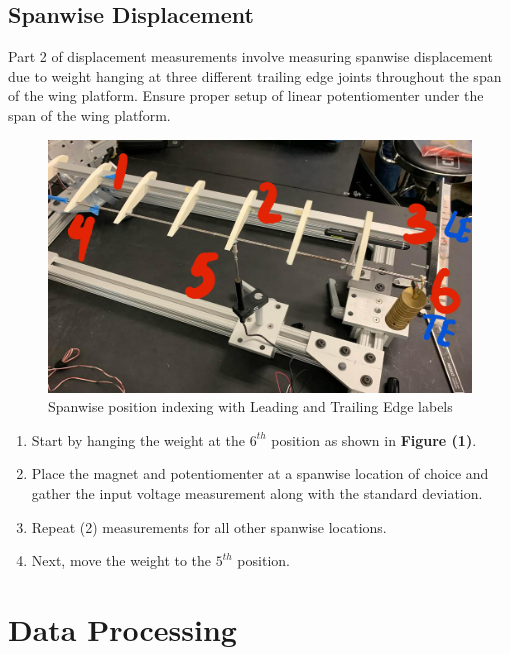 \documentclass{article}
\begin{document}
  \subsection{Spanwise Displacement}
  Part 2 of displacement measurements involve measuring spanwise displacement due to weight hanging at three different trailing edge joints throughout the span of the wing platform. Ensure proper setup of linear potentiomenter under the span of the wing platform. 
  \begin{figure}
    \centering
    \includegraphics[width = \textwidth]{lab3images/SpanwiseLocations.jpg}
    \caption{Spanwise position indexing with Leading and Trailing Edge labels}
  \end{figure}
  
  \begin{enumerate}
    \item Start by hanging the weight at the $6^{th}$ position as shown in \textbf{Figure (1)}. 
    \vspace{2.5mm}

    \item Place the magnet and potentiomenter at a spanwise location of choice and gather the input voltage measurement along with the standard deviation.
    \vspace{2.5mm}

    \item Repeat (2) measurements for all other spanwise locations.
    \vspace{2.5mm}

    \item Next, move the weight to the $5^{th}$ position.
    \vspace{2.5mm}
  \end{enumerate}

\section{Data Processing}
\end{document}
